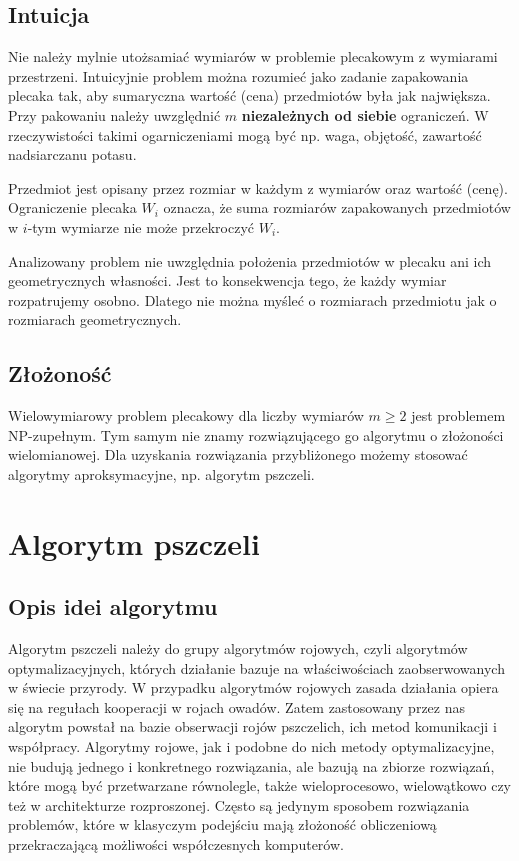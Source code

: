 \documentclass[a4paper,12pt,notitlepage]{mwrep}
\begin{document}
\section{Intuicja}
Nie należy mylnie utożsamiać wymiarów w problemie plecakowym z 
wymiarami przestrzeni. Intuicyjnie problem można rozumieć jako zadanie
zapakowania plecaka tak, aby sumaryczna wartość (cena)
przedmiotów była jak największa.
Przy pakowaniu należy uwzględnić $m$ \textbf{niezależnych od siebie}
ograniczeń. W rzeczywistości takimi ogarniczeniami mogą być np. waga,
objętość, zawartość nadsiarczanu potasu.

Przedmiot jest opisany przez
rozmiar w każdym z wymiarów oraz wartość (cenę). Ograniczenie plecaka
$W_i$ oznacza, że suma rozmiarów zapakowanych przedmiotów w $i$-tym
wymiarze nie może przekroczyć $W_i$.

Analizowany problem nie uwzględnia położenia przedmiotów w plecaku
ani ich geometrycznych własności. Jest to konsekwencja tego, że każdy
wymiar rozpatrujemy osobno. Dlatego nie można myśleć o rozmiarach
przedmiotu jak o rozmiarach geometrycznych.

\section{Złożoność}
Wielowymiarowy problem plecakowy dla liczby wymiarów $m \ge 2$ jest
problemem NP-zupełnym. Tym samym nie znamy rozwiązującego go
algorytmu o złożoności wielomianowej. Dla uzyskania rozwiązania
przybliżonego możemy stosować algorytmy aproksymacyjne, np. algorytm
pszczeli.


\chapter{Algorytm pszczeli}
\section{Opis idei algorytmu}
Algorytm pszczeli należy do grupy algorytmów rojowych, czyli algorytmów optymalizacyjnych,
których działanie bazuje na właściwościach zaobserwowanych w świecie przyrody. W przypadku
algorytmów rojowych zasada działania opiera się na regułach kooperacji w rojach owadów.
Zatem zastosowany przez nas algorytm powstał na bazie obserwacji rojów pszczelich, ich metod
komunikacji i współpracy. Algorytmy rojowe, jak i podobne do nich metody optymalizacyjne,
nie budują jednego i konkretnego rozwiązania, ale bazują na zbiorze rozwiązań, które mogą być
przetwarzane równolegle, także wieloprocesowo, wielowątkowo czy też w architekturze rozproszonej.
Często są jedynym sposobem rozwiązania problemów, które w klasyczym podejściu mają złożoność obliczeniową
przekraczającą możliwości współczesnych komputerów.
\end{document}
